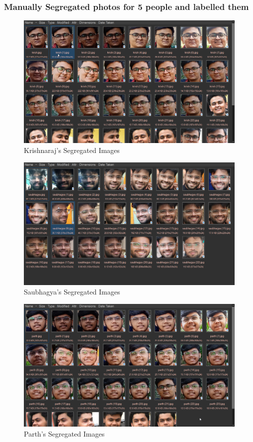 \documentclass[openany]{report}
\begin{document}
\subsubsection{Manually Segregated photos for 5 people and labelled them}
\begin{figure}[H]
    \centering
    \includegraphics[width=.95\textwidth]{../imgs/krishnaraj.png}
    \caption{Krishnaraj's Segregated Images}
\end{figure}
\begin{figure}[H]
    \centering
    \includegraphics[width=.95\textwidth]{../imgs/saubhagya.png}
    \caption{Saubhagya's Segregated Images}
\end{figure}
\begin{figure}[H]
    \centering
    \includegraphics[width=.95\textwidth]{../imgs/parth.png}
    \caption{Parth's Segregated Images}
\end{figure}
\end{document}
